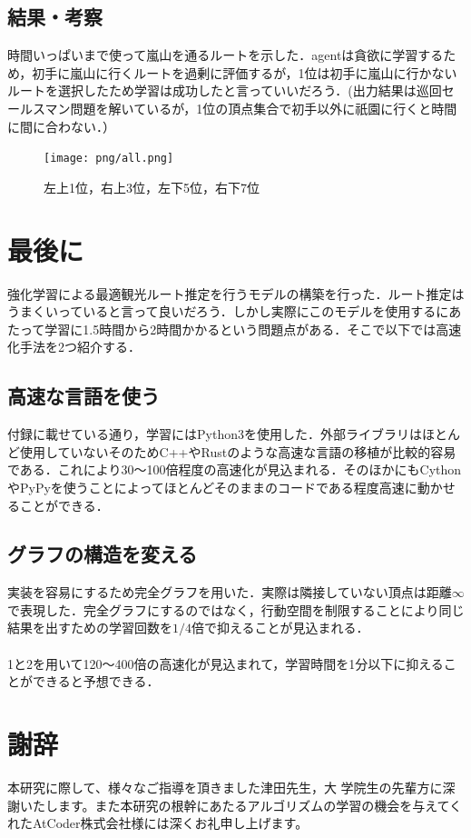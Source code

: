 \documentclass[a4paper,12pt]{jsreport}
\theoremstyle{definition}
\begin{document}
\section{結果・考察}
時間いっぱいまで使って嵐山を通るルートを示した．agentは貪欲に学習するため，初手に嵐山に行くルートを過剰に評価するが，1位は初手に嵐山に行かないルートを選択したため学習は成功したと言っていいだろう．(出力結果は巡回セールスマン問題を解いているが，1位の頂点集合で初手以外に祇園に行くと時間に間に合わない．）
\begin{figure}
    \centering
    \texttt{[image: png/all.png]}
    \caption{左上1位，右上3位，左下5位，右下7位}
    \label{fig:all}
\end{figure}



\chapter{最後に}
強化学習による最適観光ルート推定を行うモデルの構築を行った．ルート推定はうまくいっていると言って良いだろう．しかし実際にこのモデルを使用するにあたって学習に1.5時間から2時間かかるという問題点がある．そこで以下では高速化手法を2つ紹介する．
\section{高速な言語を使う}
付録に載せている通り，学習にはPython3を使用した．外部ライブラリはほとんど使用していないそのためC++やRustのような高速な言語の移植が比較的容易である．これにより30～100倍程度の高速化が見込まれる．そのほかにもCythonやPyPyを使うことによってほとんどそのままのコードである程度高速に動かせることができる．
\section{グラフの構造を変える}
実装を容易にするため完全グラフを用いた．実際は隣接していない頂点は距離$\infty$で表現した．完全グラフにするのではなく，行動空間を制限することにより同じ結果を出すための学習回数を$1/4$倍で抑えることが見込まれる．
\\　\\
1と2を用いて120～400倍の高速化が見込まれて，学習時間を1分以下に抑えることができると予想できる．


\chapter*{謝辞}
本研究に際して、様々なご指導を頂きました津田先生，大
学院生の先輩方に深謝いたします。また本研究の根幹にあたるアルゴリズムの学習の機会を与えてくれたAtCoder株式会社様には深くお礼申し上げます。
\end{document}
